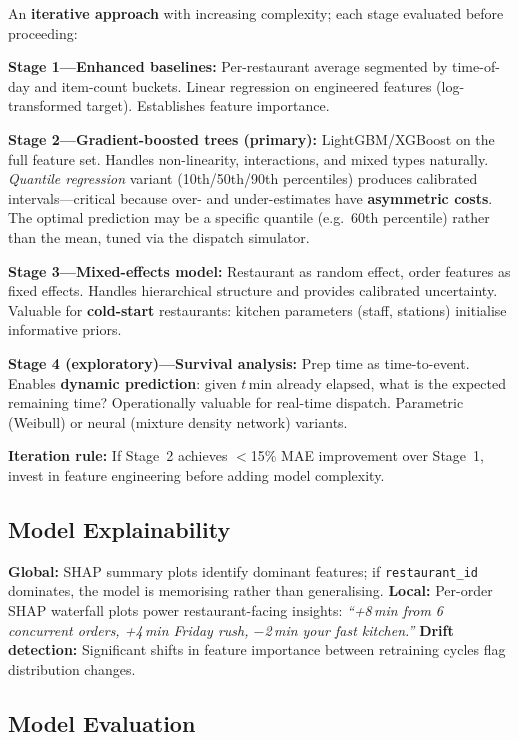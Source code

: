 \documentclass[11pt,a4paper]{article}
\begin{document}
An \textbf{iterative approach} with increasing complexity; each stage evaluated before proceeding:

\textbf{Stage 1---Enhanced baselines:} Per-restaurant average segmented by time-of-day and item-count buckets. Linear regression on engineered features (log-transformed target). Establishes feature importance.

\textbf{Stage 2---Gradient-boosted trees (primary):} LightGBM/XGBoost on the full feature set. Handles non-linearity, interactions, and mixed types naturally. \textit{Quantile regression} variant (10th/50th/90th percentiles) produces calibrated intervals---critical because over- and under-estimates have \textbf{asymmetric costs}. The optimal prediction may be a specific quantile (e.g.\ 60th percentile) rather than the mean, tuned via the dispatch simulator.

\textbf{Stage 3---Mixed-effects model:} Restaurant as random effect, order features as fixed effects. Handles hierarchical structure and provides calibrated uncertainty. Valuable for \textbf{cold-start} restaurants: kitchen parameters (staff, stations) initialise informative priors.

\textbf{Stage 4 (exploratory)---Survival analysis:} Prep time as time-to-event. Enables \textbf{dynamic prediction}: given $t$\,min already elapsed, what is the expected remaining time? Operationally valuable for real-time dispatch. Parametric (Weibull) or neural (mixture density network) variants.

\textbf{Iteration rule:} If Stage~2 achieves $<$15\% MAE improvement over Stage~1, invest in feature engineering before adding model complexity.

\subsection{Model Explainability}

\textbf{Global:} SHAP summary plots identify dominant features; if \texttt{restaurant\_id} dominates, the model is memorising rather than generalising. \textbf{Local:} Per-order SHAP waterfall plots power restaurant-facing insights: \textit{``+8\,min from 6 concurrent orders, +4\,min Friday rush, $-$2\,min your fast kitchen.''} \textbf{Drift detection:} Significant shifts in feature importance between retraining cycles flag distribution changes.

\subsection{Model Evaluation}
\end{document}
